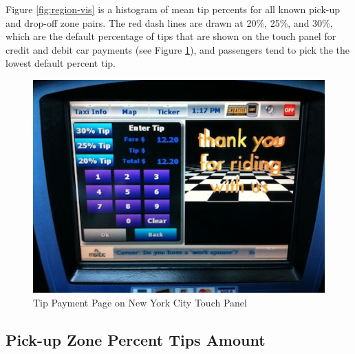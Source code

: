 \documentclass[12pt,twoside]{reedthesis}
\theoremstyle{definition}
\theoremstyle{definition}
\theoremstyle{definition}
\theoremstyle{remark}
\begin{document}
Figure \ref{fig:region-vis} is a histogram of mean tip percents for all
known pick-up and drop-off zone pairs. The red dash lines are drawn at
20\%, 25\%, and 30\%, which are the default percentage of tips that are
shown on the touch panel for credit and debit car payments (see Figure
\ref{fig:taxi-screen}), and passengers tend to pick the the lowest
default percent tip.
\begin{figure}[h]

{\centering \includegraphics[width=4.8in]{figure/taxi-screen} 

}

\caption{Tip Payment Page on New York City Touch Panel}\label{fig:taxi-screen}
\end{figure}
\subsection{Pick-up Zone Percent Tips
Amount}\label{pick-up-zone-percent-tips-amount}
\end{document}

